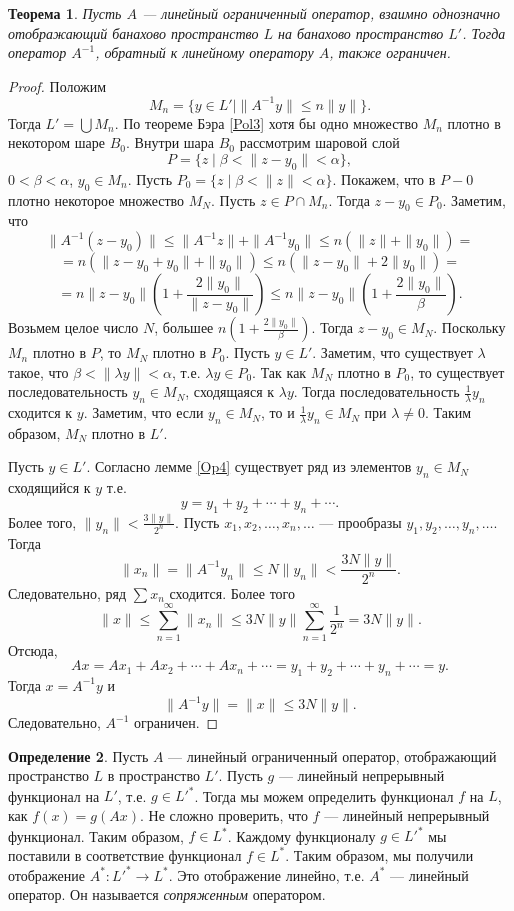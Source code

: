 \documentclass[12pt, titlepage, oneside]{amsbook}
\newtheorem{theorem}{Теорема}[chapter]
\theoremstyle{definition}
\newtheorem{definition}[theorem]{Определение}
\theoremstyle{remark}
\begin{document}
\begin{theorem}
	\label{Op5}
	Пусть $A$  --- линейный ограниченный оператор, взаимно однозначно отображающий банахово пространство $L$ на банахово пространство $L'$. Тогда оператор $A^{-1}$, обратный к линейному оператору $A$, также ограничен.
\end{theorem}

\begin{proof}
	Положим $$M_n=\{y\in L'\mid \|A^{-1}y\|\leq n\|y\|\}.$$ Тогда $L'=\bigcup M_n$. По теореме Бэра \ref{Pol3} хотя бы одно множество $M_n$ плотно в некотором шаре $B_0$. Внутри шара $B_0$ рассмотрим шаровой слой $$P=\{z\mid\beta<\|z-y_0\|<\alpha\},$$ $0<\beta<\alpha$, $y_0\in M_n$. Пусть $P_0=\{z\mid\beta<\|z\|<\alpha\}.$ Покажем, что в $P-0$ плотно некоторое множество $M_N$. Пусть $z\in P\cap M_n$. Тогда $z-y_0\in P_0$. Заметим, что $$\|A^{-1}(z-y_0)\|\leq \|A^{-1}z\|+\|A^{-1}y_0\|\leq n(\|z\|+\|y_0\|)=$$ $$=n(\|z-y_0+y_0\|+\|y_0\|)\leq n(\|z-y_0\|+2\|y_0\|)=$$ $$=n\|z-y_0\|\left(1+\frac{2\|y_0\|}{\|z-y_0\|}\right)\leq n\|z-y_0\|\left(1+\frac{2\|y_0\|}{\beta}\right).$$ Возьмем целое число $N$, большее $n\left(1+\frac{2\|y_0\|}{\beta}\right).$ Тогда $z-y_0\in M_N$. Поскольку $M_n$ плотно в $P$, то $M_N$ плотно в $P_0$. Пусть $y\in L'$. Заметим, что существует $\lambda$ такое, что $\beta<\|\lambda y\|<\alpha$, т.е. $\lambda y\in P_0$. Так как $M_N$ плотно в $P_0$, то существует последовательность $y_n\in M_N$, сходящаяся к $\lambda y$. Тогда последовательность $\frac{1}{\lambda}y_n$ сходится к $y$. Заметим, что если $y_n\in M_N$, то и $\frac{1}{\lambda}y_n\in M_N$ при $\lambda\neq 0$. Таким образом, $M_N$ плотно в $L'$.
	
	Пусть $y\in L'$. Согласно лемме \ref{Op4} существует ряд из элементов $y_n\in M_N$ сходящийся к $y$ т.е. $$y=y_1+y_2+\cdots+y_n+\cdots.$$ Более того, $\|y_n\|<\frac{3\|y\|}{2^n}$. Пусть $x_1,x_2,\ldots,x_n,\ldots$ --- прообразы $y_1,y_2,\ldots,y_n,\ldots$. Тогда $$\|x_n\|=\|A^{-1}y_n\|\leq N\|y_n\|<\frac{3N\|y\|}{2^n}.$$ Следовательно, ряд $\sum x_n$ сходится. Более того $$\|x\|\leq\sum\limits_{n=1}^{\infty}\|x_n\|\leq 3N\|y\|\sum\limits_{n=1}^{\infty}\frac{1}{2^n}=3N\|y\|.$$ Отсюда, $$Ax=Ax_1+Ax_2+\cdots+Ax_n+\cdots=y_1+y_2+\cdots+y_n+\cdots=y.$$ Тогда $x=A^{-1}y$ и $$\|A^{-1}y\|=\|x\|\leq 3N\|y\|.$$ Следовательно, $A^{-1}$ ограничен.
\end{proof}

\begin{definition}
	Пусть $A$  --- линейный ограниченный оператор, отображающий пространство $L$ в пространство $L'$. Пусть $g$ --- линейный непрерывный функционал на $L'$, т.е. $g\in L'^*$. Тогда мы можем определить функционал $f$ на $L$, как $f(x)=g(Ax)$. Не сложно проверить, что $f$ --- линейный непрерывный функционал. Таким образом, $f\in L^*$. Каждому функционалу $g\in L'^*$ мы поставили в соответствие функционал $f\in L^*$. Таким образом, мы получили отображение $A^*\colon L'^*\rightarrow L^*$. Это отображение линейно, т.е. $A^*$ --- линейный оператор. Он называется \emph{сопряженным} оператором.
\end{definition}
\end{document}
